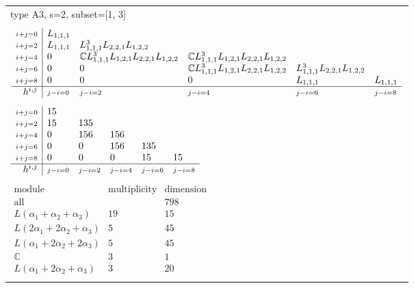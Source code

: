 \documentclass[crop,border=2mm]{standalone}
\begin{document}
\begin{tabular}{l}
{\huge type A3, s=2, subset=[1, 3]}\\ \\


$\displaystyle
\begin{array}{r|l l l l l}
	{\scriptstyle i+j=0}&L_{1,1,1}&&&&\\
	{\scriptstyle i+j=2}&L_{1,1,1}&L_{1,1,1}^{3}L_{2,2,1}L_{1,2,2}&&&\\
	{\scriptstyle i+j=4}&0&\mathbb{C}L_{1,1,1}^{3}L_{1,2,1}L_{2,2,1}L_{1,2,2}&\mathbb{C}L_{1,1,1}^{3}L_{1,2,1}L_{2,2,1}L_{1,2,2}&&\\
	{\scriptstyle i+j=6}&0&0&\mathbb{C}L_{1,1,1}^{3}L_{1,2,1}L_{2,2,1}L_{1,2,2}&L_{1,1,1}^{3}L_{2,2,1}L_{1,2,2}&\\
	{\scriptstyle i+j=8}&0&0&0&L_{1,1,1}&L_{1,1,1}\\
	\hline h^{i,j}&{\scriptstyle j-i=0}&{\scriptstyle j-i=2}&{\scriptstyle j-i=4}&{\scriptstyle j-i=6}&{\scriptstyle j-i=8}
\end{array}
$ \\ \\


$\displaystyle
\begin{array}{r|l l l l l}
	{\scriptstyle i+j=0}&15&&&&\\
	{\scriptstyle i+j=2}&15&135&&&\\
	{\scriptstyle i+j=4}&0&156&156&&\\
	{\scriptstyle i+j=6}&0&0&156&135&\\
	{\scriptstyle i+j=8}&0&0&0&15&15\\
	\hline h^{i,j}&{\scriptstyle j-i=0}&{\scriptstyle j-i=2}&{\scriptstyle j-i=4}&{\scriptstyle j-i=6}&{\scriptstyle j-i=8}
\end{array}
$ \\ \\


$\displaystyle
\begin{array}{rll}
	\text{module}&\text{multiplicity}&\text{dimension} \\ \hline \text{all}&&798 \\
	L\left(\alpha_{1}+\alpha_{2}+\alpha_{3}\right)&19&15\\
	L\left( 2\alpha_{1}+ 2\alpha_{2}+\alpha_{3}\right)&5&45\\
	L\left(\alpha_{1}+ 2\alpha_{2}+ 2\alpha_{3}\right)&5&45\\
	\mathbb{C}&3&1\\
	L\left(\alpha_{1}+ 2\alpha_{2}+\alpha_{3}\right)&3&20
\end{array}
$ \\ \\

\end{tabular}
\end{document}
